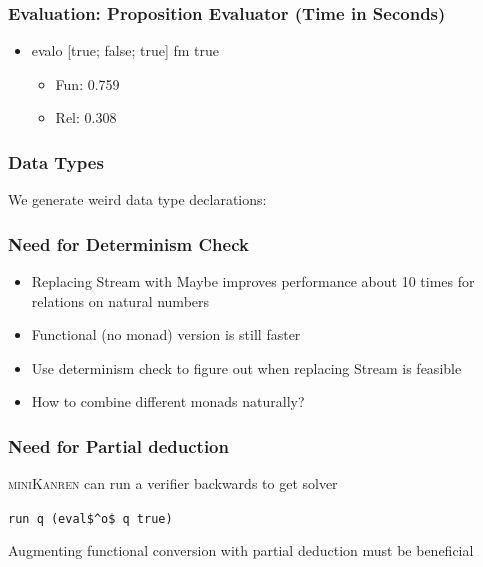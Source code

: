 \documentclass[xcolor=table]{beamer}
\newcommand{\mk}{\textsc{miniKanren}\xspace}
\begin{document}
\begin{frame}[fragile]
  \frametitle{Evaluation: Proposition Evaluator (Time in Seconds)}
\begin{itemize}
  \item evalo [true; false; true] fm true
  \begin{itemize}
    \item Fun: 0.759
    \item Rel: 0.308
  \end{itemize}
\end{itemize}
\end{frame}

\begin{frame}[fragile]
  \frametitle{Data Types}
We generate weird data type declarations:

\end{frame}

\begin{frame}[fragile]
  \frametitle{Need for Determinism Check}
  \begin{itemize}
    \item Replacing Stream with Maybe improves performance about 10 times for relations on natural numbers
    \item Functional (no monad) version is still faster
    \item Use determinism check to figure out when replacing Stream is feasible
    \item How to combine different monads naturally?
  \end{itemize}
\end{frame}



\begin{frame}[fragile]
  \frametitle{Need for Partial deduction}

\begin{center}
\mk can run a verifier backwards to get solver
\end{center}

\begin{center}
\begin{minipage}{0.3\textwidth}
  \lstinline{run q (eval$^o$ q true)}
\end{minipage}

\begin{center}
  Augmenting functional conversion with partial deduction must be beneficial
\end{center}
\end{center}


\end{frame}
\end{document}
